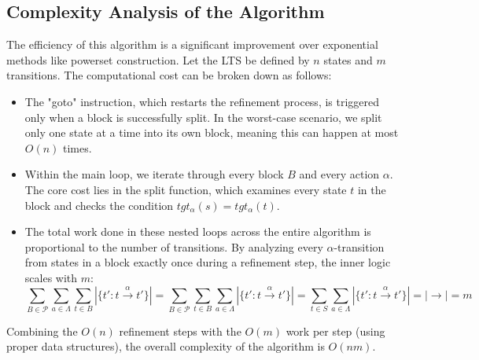 \subsection{Complexity Analysis of the Algorithm}
The efficiency of this algorithm is a significant improvement over exponential methods like powerset construction. Let the LTS be defined by $n$ states and $m$ transitions. The computational cost can be broken down as follows:
\begin{itemize}
    \item The "goto" instruction, which restarts the refinement process, is triggered only when a block is successfully split. In the worst-case scenario, we split only one state at a time into its own block, meaning this can happen at most $O(n)$ times.
    \item Within the main loop, we iterate through every block $B$ and every action $\alpha$. The core cost lies in the split function, which examines every state $t$ in the block and checks the condition $tgt_{\alpha}(s) = tgt_{\alpha}(t)$.
    \item The total work done in these nested loops across the entire algorithm is proportional to the number of transitions. By analyzing every $\alpha$-transition from states in a block exactly once during a refinement step, the inner logic scales with $m$:
    \begin{equation*}
        \sum_{B\in\mathcal{P}}\sum_{a\in\Lambda}\sum_{t\in B}|\{t':t\xrightarrow{\alpha}t'\}|=
        \sum_{B\in\mathcal{P}}\sum_{t\in B}\sum_{a\in\Lambda}|\{t':t\xrightarrow{\alpha}t'\}|=
        \sum_{t\in S}\sum_{a\in\Lambda}|\{t':t\xrightarrow{\alpha}t'\}|= |\rightarrow| = m
    \end{equation*}
\end{itemize}
Combining the $O(n)$ refinement steps with the $O(m)$ work per step (using proper data structures), the overall complexity of the algorithm is $O(nm)$.


